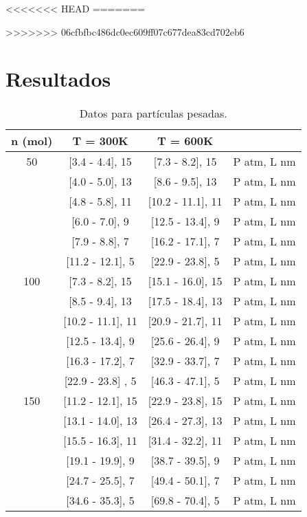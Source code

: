 \documentclass[]{article}
\begin{document}
<<<<<<< HEAD
=======








>>>>>>> 06cfbfbc486dc0ec609ff07c677dea83cd702eb6
\section{Resultados}

 




\begin{table}[h]
 \centering
 \begin{tabular}{|c|c|c|l|} \hline
  n (mol)&  T = 300K        &    T = 600K    &        \\ \hline
   50    & [3.4 - 4.4], 15 & [7.3 - 8.2], 15& P atm, L nm\\ 
         & [4.0 - 5.0], 13 & [8.6 - 9.5], 13& P atm, L nm\\
         & [4.8 - 5.8], 11 & [10.2 - 11.1], 11& P atm, L nm\\ 
         & [6.0 - 7.0],  9 & [12.5 - 13.4],  9& P atm, L nm\\ 
         & [7.9 - 8.8],  7 & [16.2 - 17.1],  7& P atm, L nm\\  
         & [11.2 - 12.1], 5 & [22.9 - 23.8],  5& P atm, L nm\\ \hline
   100   & [7.3 - 8.2], 15 & [15.1 - 16.0], 15& P atm, L nm\\ 
         & [8.5 - 9.4], 13 & [17.5 - 18.4], 13& P atm, L nm\\
         & [10.2 - 11.1], 11 & [20.9 - 21.7], 11& P atm, L nm\\ 
         & [12.5 - 13.4], 9 & [25.6 - 26.4],  9& P atm, L nm\\ 
         & [16.3 - 17.2], 7 & [32.9 - 33.7],  7& P atm, L nm\\  
         & [22.9 - 23.8] , 5 & [46.3 - 47.1],  5& P atm, L nm\\ \hline
   150   & [11.2 - 12.1], 15 & [22.9 - 23.8], 15& P atm, L nm\\ 
         & [13.1 - 14.0], 13 & [26.4 - 27.3], 13& P atm, L nm\\
         & [15.5 - 16.3], 11 & [31.4 - 32.2], 11& P atm, L nm\\ 
         & [19.1 - 19.9],  9 & [38.7 - 39.5],  9& P atm, L nm\\ 
         & [24.7 - 25.5],  7 & [49.4 - 50.1],  7& P atm, L nm\\  
         & [34.6 - 35.3],  5 & [69.8 - 70.4],  5& P atm, L nm\\ \hline

   

\end{tabular}
\caption{\label{tab:Pesadas} Datos para partículas pesadas.}
\end{table}
\end{document}
